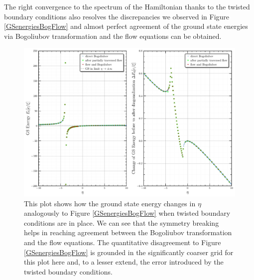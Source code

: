 The right convergence to the spectrum of the Hamiltonian thanks to the twisted boundary conditions also resolves the discrepancies we observed in Figure \ref{GSenergiesBogFlow} and almost perfect agreement of the ground state energies via Bogoliubov transformation and the flow equations can be obtained.
\begin{figure}[H]
    \centering
    \includegraphics[width=\textwidth]{figures/plots/PDF/GS_energies_bog_flow_comp_N=40.pdf}
    \caption[Ground state energy with twisted boundary conditions]{This plot shows how the ground state energy changes in $\eta$ analogously to Figure \ref{GSenergiesBogFlow} when twisted boundary conditions are in place. We can see that the symmetry breaking helps in reaching agreement between the Bogoliubov transformation and the flow equations. The quantitative disagreement to Figure \ref{GSenergiesBogFlow} is grounded in the significantly coarser grid for this plot here and, to a lesser extend, the error introduced by the twisted boundary conditions.}
    \label{ConvergenceImprovementsTwisted}
\end{figure}
